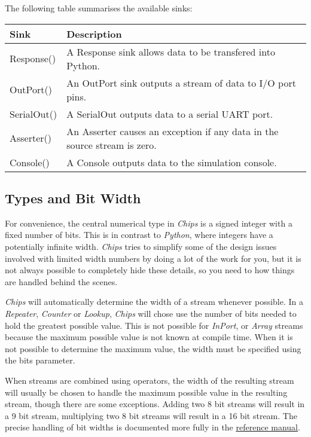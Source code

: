 \documentclass[letterpaper,10pt,english]{sphinxmanual}
\begin{document}
The following table summarises the available sinks:

\begin{tabulary}{\linewidth}{|L|L|}
\hline
\textbf{
Sink
} & \textbf{
Description
}\\
\hline

Response()
 & 
A Response sink allows data to be transfered into
Python.
\\

OutPort()
 & 
An OutPort sink outputs a stream of data to I/O port
pins.
\\

SerialOut()
 & 
A SerialOut outputs data to a serial UART port.
\\

Asserter()
 & 
An Asserter causes an exception if any data in the
source stream is zero.
\\

Console()
 & 
A Console outputs data to the simulation console.
\\
\hline
\end{tabulary}

\begin{quote}
\end{quote}


\subsection{Types and Bit Width}
\label{tutorial/index:types-and-bit-width}
For convenience, the central numerical type in \emph{Chips} is a signed integer with
a fixed number of bits.  This is in contrast to \emph{Python}, where integers have a
potentially infinite width. \emph{Chips} tries to simplify some of the design issues
involved with limited width numbers by doing a lot of the work for you, but it
is not always possible to completely hide these details, so you need to how
things are handled behind the scenes.

\emph{Chips} will automatically determine the width of a stream whenever possible.
In a \emph{Repeater}, \emph{Counter} or \emph{Lookup}, \emph{Chips} will chose use the number of
bits needed to hold the greatest possible value. This is not possible for
\emph{InPort}, or \emph{Array} streams because the maximum possible value is not known at
compile time. When it is not possible to determine the maximum value, the width
must be specified using the bits parameter.

When streams are combined using operators, the width of the resulting stream
will usually be chosen to handle the maximum possible value in the resulting
stream, though there are some exceptions. Adding two 8 bit streams will result
in a 9 bit stream, multiplying two 8 bit streams will result in a 16 bit
stream. The precise handling of bit widths is documented more  fully in the
\href{http://dawsonjon.github.com/chips/language\_reference/}{reference manual}.
\end{document}
